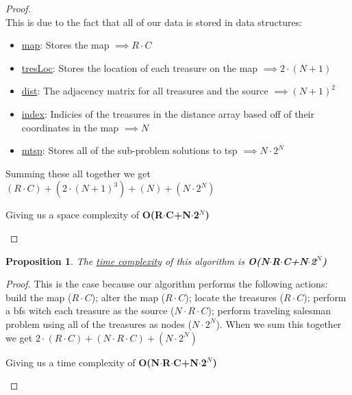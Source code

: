 \documentclass[12pt]{article}
\newtheorem{proposition}[theorem]{Proposition}
\begin{document}
\begin{proof}
~ \\ \indent This is due to the fact that all of our data is stored in data structures:
\begin{itemize}
    \item \underline{map}: Stores the map $\implies R\cdot C$
    \item \underline{tresLoc}: Stores the location of each treasure on the map $\implies 2\cdot (N+1)$
    \item \underline{dist}: The adjacency matrix for all treasures and the source $\implies (N+1)^2$
    \item \underline{index}: Indicies of the treasures in the distance array based off of
            their coordinates in the map $\implies N$
    \item \underline{mtsp}: Stores all of the sub-problem solutions to tsp $\implies N\cdot 2^N$
\end{itemize}
Summing these all together we get $(R\cdot C) + (2\cdot(N+1)^3) + (N) + (N\cdot2^N)$
\begin{center}
    Giving us a space complexity of \textbf{O(R$\cdot$C+N$\cdot$2$^N$)}
\end{center}
\end{proof}

\begin{proposition}
\label{numq}
The \underline{time complexity} of this algorithm is \textbf{O(N$\cdot$R$\cdot$C+N$\cdot$2$^N$)}
\end{proposition}

\begin{proof}
This is the case because our algorithm performs the following actions: build the map ($R\cdot C$);
alter the map ($R\cdot C$); locate the treasures ($R\cdot C$); perform a bfs witch each treasure as
the source ($N\cdot R\cdot C$); perform traveling salesman problem using all of the treasures as
nodes ($N\cdot 2^N$).  When we sum this together we get $2\cdot(R\cdot C) + (N\cdot R\cdot C) +
(N\cdot 2^N)$
\begin{center}
    Giving us a time complexity of \textbf{O(N$\cdot$R$\cdot$C+N$\cdot$2$^N$)}
\end{center}
\end{proof}

\end{document}
